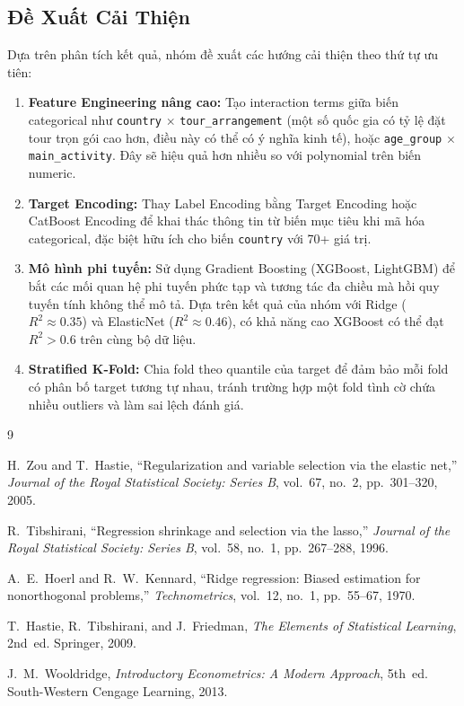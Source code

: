 \documentclass[12pt,a4paper]{article}
\begin{document}
\subsection{Đề Xuất Cải Thiện}

Dựa trên phân tích kết quả, nhóm đề xuất các hướng cải thiện theo thứ tự ưu tiên:

\begin{enumerate}[leftmargin=1.5em]
    \item \textbf{Feature Engineering nâng cao:} Tạo interaction terms giữa biến categorical như \texttt{country} $\times$ \texttt{tour\_arrangement} (một số quốc gia có tỷ lệ đặt tour trọn gói cao hơn, điều này có thể có ý nghĩa kinh tế), hoặc \texttt{age\_group} $\times$ \texttt{main\_activity}. Đây sẽ hiệu quả hơn nhiều so với polynomial trên biến numeric.

    \item \textbf{Target Encoding:} Thay Label Encoding bằng Target Encoding hoặc CatBoost Encoding để khai thác thông tin từ biến mục tiêu khi mã hóa categorical, đặc biệt hữu ích cho biến \texttt{country} với 70+ giá trị.

    \item \textbf{Mô hình phi tuyến:} Sử dụng Gradient Boosting (XGBoost, LightGBM) để bắt các mối quan hệ phi tuyến phức tạp và tương tác đa chiều mà hồi quy tuyến tính không thể mô tả. Dựa trên kết quả của nhóm với Ridge ($R^2 \approx 0.35$) và ElasticNet ($R^2 \approx 0.46$), có khả năng cao XGBoost có thể đạt $R^2 > 0.6$ trên cùng bộ dữ liệu.

    \item \textbf{Stratified K-Fold:} Chia fold theo quantile của target để đảm bảo mỗi fold có phân bố target tương tự nhau, tránh trường hợp một fold tình cờ chứa nhiều outliers và làm sai lệch đánh giá.
\end{enumerate}

\newpage
\begin{thebibliography}{9}

H.~Zou and T.~Hastie, ``Regularization and variable selection via the elastic net,'' \textit{Journal of the Royal Statistical Society: Series B}, vol.~67, no.~2, pp.~301--320, 2005.

R.~Tibshirani, ``Regression shrinkage and selection via the lasso,'' \textit{Journal of the Royal Statistical Society: Series B}, vol.~58, no.~1, pp.~267--288, 1996.

A.~E.~Hoerl and R.~W.~Kennard, ``Ridge regression: Biased estimation for nonorthogonal problems,'' \textit{Technometrics}, vol.~12, no.~1, pp.~55--67, 1970.

T.~Hastie, R.~Tibshirani, and J.~Friedman, \textit{The Elements of Statistical Learning}, 2nd~ed. Springer, 2009.

J.~M.~Wooldridge, \textit{Introductory Econometrics: A Modern Approach}, 5th~ed. South-Western Cengage Learning, 2013.

\end{thebibliography}
\end{document}
